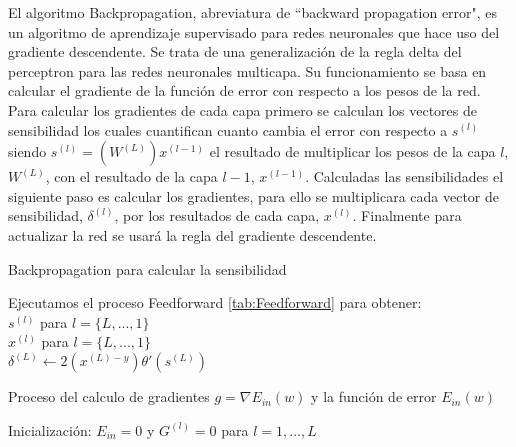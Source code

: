 El algoritmo Backpropagation, abreviatura de ``backward propagation error", es un algoritmo de aprendizaje supervisado para redes neuronales que hace uso del gradiente descendente. Se trata de una generalización de la regla delta del perceptron para las redes neuronales multicapa. Su funcionamiento se basa en calcular el gradiente de la función de error con respecto a los pesos de la red. Para calcular los gradientes de cada capa primero se calculan los vectores de sensibilidad los cuales cuantifican cuanto cambia el error con respecto a $s^{(l)}$ siendo $s^{(l)} = (W^{(L)})x^{(l-1)}$ el resultado de multiplicar los pesos de la capa $l$, $W^{(L)}$, con el resultado de la capa $l-1$, $x^{(l-1)}$. Calculadas las sensibilidades el siguiente paso es calcular los gradientes, para ello se multiplicara cada vector de sensibilidad, $\delta^{(l)}$, por los resultados de cada capa, $x^{(l)}$. Finalmente para actualizar la red se usará la regla del gradiente descendente.

\begin{algorithm}[H]
   \caption{Backpropagation para calcular la sensibilidad}
   Ejecutamos el proceso Feedforward \ref{tab:Feedforward} para obtener:\\
   $s^{(l)}$ para $l = \{L,...,1\}$ \\
   $x^{(l)}$ para $l = \{L,...,1\}$ \\  
   $\delta^{(L)} \gets 2(x^{(L)-y})\theta'(s^{(L)})$ \\
   
   \label{tab:Backprop_alg}
\end{algorithm}

\begin{algorithm}[H]
   \caption{Proceso del calculo de gradientes $g = \nabla E_{in}(w)$ y la función de error $E_{in}(w)$}
   Inicialización: $E_{in} = 0$ y $G^{(l)} = 0 $ para $l = 1,...,L$ \\
\end{algorithm}

